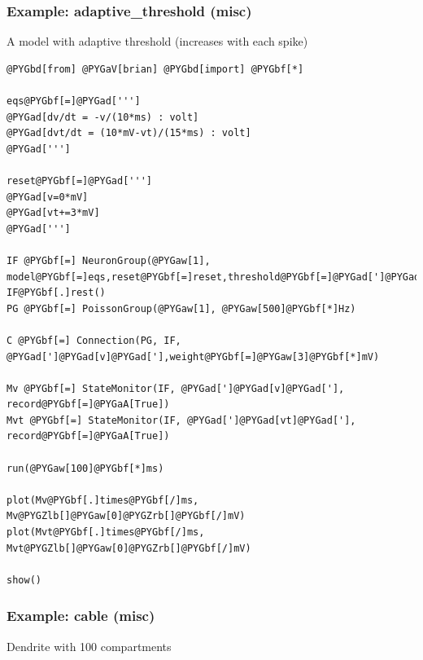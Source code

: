 \documentclass[letterpaper,10pt,english]{manual}
\begin{document}
\hypertarget{index-58}{}\subsubsection{Example: adaptive\_threshold (misc)}

A model with adaptive threshold (increases with each spike)

\begin{Verbatim}[commandchars=@\[\]]
@PYGbd[from] @PYGaV[brian] @PYGbd[import] @PYGbf[*]

eqs@PYGbf[=]@PYGad[''']
@PYGad[dv/dt = -v/(10*ms) : volt]
@PYGad[dvt/dt = (10*mV-vt)/(15*ms) : volt]
@PYGad[''']

reset@PYGbf[=]@PYGad[''']
@PYGad[v=0*mV]
@PYGad[vt+=3*mV]
@PYGad[''']

IF @PYGbf[=] NeuronGroup(@PYGaw[1], model@PYGbf[=]eqs,reset@PYGbf[=]reset,threshold@PYGbf[=]@PYGad[']@PYGad[v@textgreater[]vt]@PYGad['])
IF@PYGbf[.]rest()
PG @PYGbf[=] PoissonGroup(@PYGaw[1], @PYGaw[500]@PYGbf[*]Hz)

C @PYGbf[=] Connection(PG, IF, @PYGad[']@PYGad[v]@PYGad['],weight@PYGbf[=]@PYGaw[3]@PYGbf[*]mV)

Mv @PYGbf[=] StateMonitor(IF, @PYGad[']@PYGad[v]@PYGad['], record@PYGbf[=]@PYGaA[True])
Mvt @PYGbf[=] StateMonitor(IF, @PYGad[']@PYGad[vt]@PYGad['], record@PYGbf[=]@PYGaA[True])

run(@PYGaw[100]@PYGbf[*]ms)

plot(Mv@PYGbf[.]times@PYGbf[/]ms, Mv@PYGZlb[]@PYGaw[0]@PYGZrb[]@PYGbf[/]mV)
plot(Mvt@PYGbf[.]times@PYGbf[/]ms, Mvt@PYGZlb[]@PYGaw[0]@PYGZrb[]@PYGbf[/]mV)

show()
\end{Verbatim}

\resetcurrentobjects
\hypertarget{--doc-examples-misc_cable}{}

\hypertarget{index-59}{}\subsubsection{Example: cable (misc)}

Dendrite with 100 compartments
\end{document}
